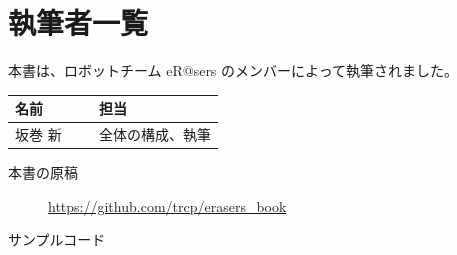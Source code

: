 \clearpage{}
\chapter*{執筆者一覧}

本書は、ロボットチーム eR@sers のメンバーによって執筆されました。

\begin{tablebox}
  \renewcommand{\arraystretch}{1.3}
  \begin{tabular}{lp{0.6\linewidth}}
    \toprule
    名前 & 担当 \\
    \midrule
    坂巻 新 & 全体の構成、執筆 \\
    \bottomrule
  \end{tabular}
\end{tablebox}

\vspace{2\baselineskip}

\begin{description}
  \item[本書の原稿] \url{https://github.com/trcp/erasers_book}
  \item[サンプルコード] \codeurl
\end{description}
